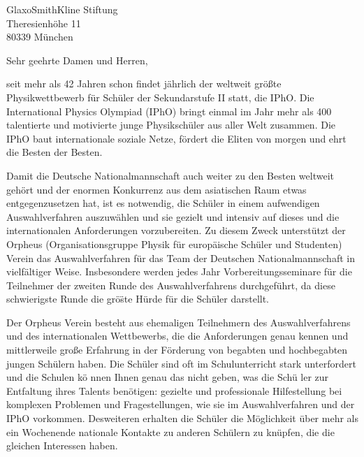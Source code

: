 \documentclass[../style/orpheus,fontsize=11pt]{scrlttr2}
\begin{document}

\begin{letter}{
\noindent GlaxoSmithKline Stiftung \\
Theresienh\"ohe 11 \\
80339 M\"unchen \\
}




\opening{Sehr geehrte Damen und Herren,}


seit mehr als 42 Jahren schon findet j\"ahrlich der weltweit gr\"o\ss te Physikwettbewerb f\"ur Sch\"uler der Sekundarstufe II statt, die IPhO.  Die International Physics Olympiad (IPhO) bringt einmal im Jahr mehr als 400 talentierte und motivierte junge Physiksch\"uler aus aller Welt zusammen.  Die IPhO baut internationale soziale Netze, f\"ordert die Eliten von morgen und ehrt die Besten der Besten.

Damit die Deutsche Nationalmannschaft auch weiter zu den Besten weltweit geh\"ort und der enormen Konkurrenz aus dem asiatischen Raum etwas entgegenzusetzen hat, ist es notwendig, die Sch\"uler in einem aufwendigen Auswahlverfahren auszuw\"ahlen und sie gezielt und intensiv auf dieses und die internationalen Anforderungen vorzubereiten.  Zu diesem Zweck unterst\"utzt der Orpheus (Organisationsgruppe Physik f\"ur europ\"aische Sch\"uler und Studenten) Verein das Auswahlverfahren f\"ur das Team der Deutschen Nationalmannschaft in vielf\"altiger Weise.  Insbesondere werden jedes Jahr Vorbereitungsseminare f\"ur die Teilnehmer der zweiten Runde des Auswahlverfahrens durchgef\"uhrt, da diese schwierigste Runde die gr\"o\"ste H\"urde f\"ur die Sch\"uler darstellt.

Der Orpheus Verein besteht aus ehemaligen Teilnehmern des Auswahlverfahrens und des internationalen Wettbewerbs, die die Anforderungen genau kennen und mittlerweile gro\ss e Erfahrung in der F\"orderung von begabten und hochbegabten jungen Sch\"ulern haben.  Die Sch\"uler sind oft im Schulunterricht stark unterfordert und die Schulen k\"o nnen Ihnen genau das nicht geben, was die Sch\"u ler zur Entfaltung ihres Talents ben\"otigen: gezielte und professionale Hilfestellung bei komplexen Problemen und Fragestellungen, wie sie im Auswahlverfahren und der IPhO vorkommen.  Desweiteren erhalten die Sch\"uler die M\"oglichkeit \"uber mehr als ein Wochenende nationale Kontakte zu anderen Sch\"ulern zu kn\"upfen, die die gleichen Interessen haben.


\end{letter}
\end{document}

